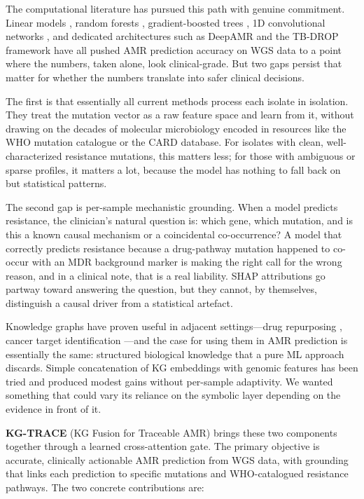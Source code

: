 \documentclass[conference]{IEEEtran}
\begin{document}
The computational literature has pursued this path with genuine commitment. Linear models \cite{linear_amr}, random forests \cite{rf_amr}, gradient-boosted trees \cite{xgb_amr}, 1D convolutional networks \cite{cnn_1d_mtb}, and dedicated architectures such as DeepAMR \cite{deepamr} and the TB-DROP framework \cite{tbdrop} have all pushed AMR prediction accuracy on WGS data to a point where the numbers, taken alone, look clinical-grade. But two gaps persist that matter for whether the numbers translate into safer clinical decisions.

The first is that essentially all current methods process each isolate in isolation. They treat the mutation vector as a raw feature space and learn from it, without drawing on the decades of molecular microbiology encoded in resources like the WHO mutation catalogue or the CARD database. For isolates with clean, well-characterized resistance mutations, this matters less; for those with ambiguous or sparse profiles, it matters a lot, because the model has nothing to fall back on but statistical patterns.

The second gap is per-sample mechanistic grounding. When a model predicts resistance, the clinician's natural question is: which gene, which mutation, and is this a known causal mechanism or a coincidental co-occurrence? A model that correctly predicts resistance because a drug-pathway mutation happened to co-occur with an MDR background marker is making the right call for the wrong reason, and in a clinical note, that is a real liability. SHAP attributions go partway toward answering the question, but they cannot, by themselves, distinguish a causal driver from a statistical artefact.

Knowledge graphs have proven useful in adjacent settings---drug repurposing \cite{kg_drug_repurpose}, cancer target identification \cite{kg_cancer}---and the case for using them in AMR prediction is essentially the same: structured biological knowledge that a pure ML approach discards. Simple concatenation of KG embeddings with genomic features has been tried and produced modest gains without per-sample adaptivity. We wanted something that could vary its reliance on the symbolic layer depending on the evidence in front of it.

\textbf{KG-TRACE} (KG Fusion for Traceable AMR) brings these two components together through a learned cross-attention gate. The primary objective is accurate, clinically actionable AMR prediction from WGS data, with grounding that links each prediction to specific mutations and WHO-catalogued resistance pathways. The two concrete contributions are:
\end{document}

